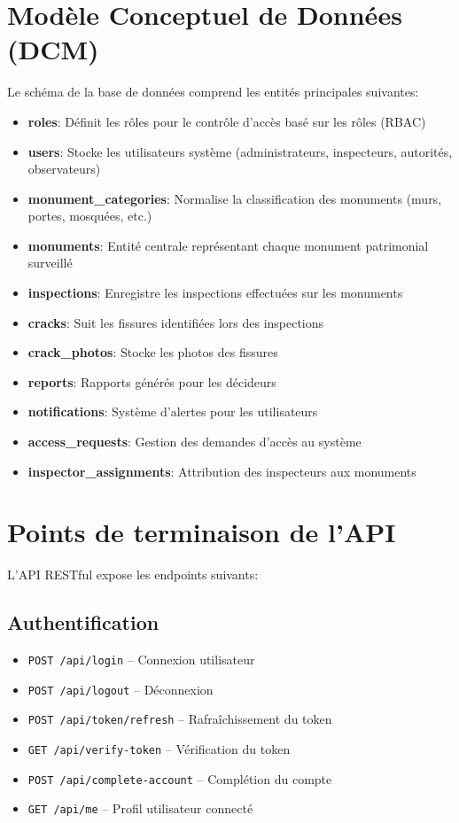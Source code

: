 \documentclass[12pt,a4paper]{article}
\begin{document}
\section{Modèle Conceptuel de Données (DCM)}

Le schéma de la base de données comprend les entités principales suivantes:

\begin{itemize}
    \item \textbf{roles}: Définit les rôles pour le contrôle d'accès basé sur les rôles (RBAC)
    \item \textbf{users}: Stocke les utilisateurs système (administrateurs, inspecteurs, autorités, observateurs)
    \item \textbf{monument\_categories}: Normalise la classification des monuments (murs, portes, mosquées, etc.)
    \item \textbf{monuments}: Entité centrale représentant chaque monument patrimonial surveillé
    \item \textbf{inspections}: Enregistre les inspections effectuées sur les monuments
    \item \textbf{cracks}: Suit les fissures identifiées lors des inspections
    \item \textbf{crack\_photos}: Stocke les photos des fissures
    \item \textbf{reports}: Rapports générés pour les décideurs
    \item \textbf{notifications}: Système d'alertes pour les utilisateurs
    \item \textbf{access\_requests}: Gestion des demandes d'accès au système
    \item \textbf{inspector\_assignments}: Attribution des inspecteurs aux monuments
\end{itemize}

\section{Points de terminaison de l'API}

L'API RESTful expose les endpoints suivants:

\subsection{Authentification}
\begin{itemize}
    \item \texttt{POST /api/login} -- Connexion utilisateur
    \item \texttt{POST /api/logout} -- Déconnexion
    \item \texttt{POST /api/token/refresh} -- Rafraîchissement du token
    \item \texttt{GET /api/verify-token} -- Vérification du token
    \item \texttt{POST /api/complete-account} -- Complétion du compte
    \item \texttt{GET /api/me} -- Profil utilisateur connecté
\end{itemize}
\end{document}
